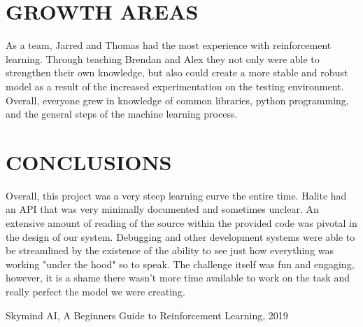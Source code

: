 \documentclass[letterpaper, 11 pt, conference]{ieeeconf}
\begin{document}
\section{GROWTH AREAS}
As a team, Jarred and Thomas had the most experience with reinforcement learning. Through teaching Brendan and Alex they not only were able to strengthen their own knowledge, but also could create a more stable and robust model as a result of the increased experimentation on the testing environment. Overall, everyone grew in knowledge of common libraries, python programming, and the general steps of the machine learning process.

\section{CONCLUSIONS}
Overall, this project was a very steep learning curve the entire time. Halite had an API that was very minimally documented and sometimes unclear. An extensive amount of reading of the source within the provided code was pivotal in the design of our system. Debugging and other development systems were able to be streamlined by the existence of the ability to see just how everything was working "under the hood" so to speak. The challenge itself was fun and engaging, however, it is a shame there wasn't more time available to work on the task and really perfect the model we were creating.

\addtolength{\textheight}{-12cm}
                                  

\begin{thebibliography}{99}
 Skymind AI, A Beginners Guide to Reinforcement Learning, 2019
\end{thebibliography}
\end{document}
